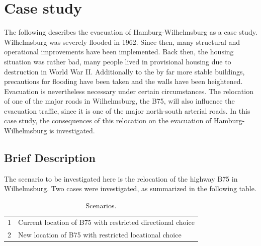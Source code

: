 
%
\section{Case study}
The following describes the evacuation of Hamburg-Wilhelmsburg as a case study. Wilhelmsburg was severely flooded in 1962. Since then, many structural and operational improvements have been implemented. Back then, the housing situation was rather bad, many people lived in provisional housing due to destruction in World War II. Additionally to the by far more stable buildings, precautions for flooding have been taken and the walls have been heightened. Evacuation is nevertheless necessary under certain circumstances. The relocation of one of the major roads in Wilhelmsburg, the B75, will also influence the evacuation traffic, since it is one of the major north-south arterial roads. In this case study, the consequences of this relocation on the evacuation of Hamburg-Wilhelmsburg is investigated.

\subsection{Brief Description}

The scenario to be investigated here is the relocation of the highway B75 in Wilhelmsburg. 
Two cases were investigated, as summarized in the following table.

\begin{table}[!ht]
\caption{Scenarios.}
\label{table:b75scenarios}
\begin{tabular}{|l | l|}
\hline
1 & Current location of B75 with restricted directional choice\\
2 & New location of B75 with restricted locational choice\\
\hline
\end{tabular}
\end{table}

